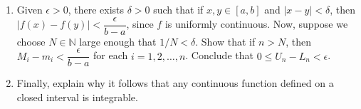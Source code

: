 \documentclass[letterpaper,12pt]{article}
\newcommand{\N}{\mathbb{N}}
\newcommand{\abs}[1]{\lvert #1\rvert}
\begin{document}
\begin{enumerate}
\begin{enumerate}
 \item Given $\epsilon>0$, there exists $\delta>0$ such that if $x,y\in [a,b]$ and $\abs{x-y}<\delta$, then $\abs{f(x)-f(y)}<\dfrac{\epsilon}{b-a}$, since $f$ is uniformly continuous. Now, suppose we choose $N\in\N$ large enough that $1/N<\delta$. Show that if $n>N$, then $M_i-m_i<\dfrac{\epsilon}{b-a}$ for each $i=1,2,\ldots, n$. Conclude that $0\leq U_n-L_n<\epsilon$.
 \item Finally, explain why it follows that any continuous function defined on a closed interval is integrable.
\end{enumerate}

\end{enumerate}
\end{document}
